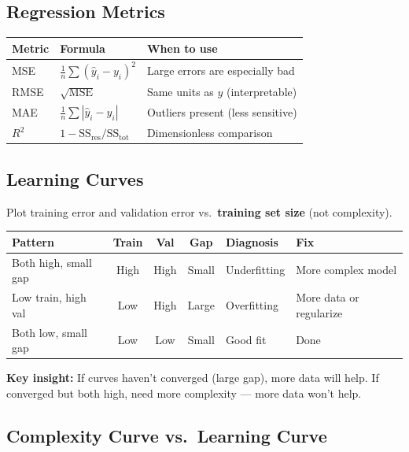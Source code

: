 \documentclass[11pt,a4paper]{article}
\begin{document}
\subsection{Regression Metrics}

\begin{center}
\begin{tabular}{|l|l|l|}
\hline
\textbf{Metric} & \textbf{Formula} & \textbf{When to use} \\
\hline
MSE & $\frac{1}{n}\sum(\hat{y}_i - y_i)^2$ & Large errors are especially bad \\
RMSE & $\sqrt{\text{MSE}}$ & Same units as $y$ (interpretable) \\
MAE & $\frac{1}{n}\sum|\hat{y}_i - y_i|$ & Outliers present (less sensitive) \\
$R^2$ & $1 - \text{SS}_{\text{res}}/\text{SS}_{\text{tot}}$ & Dimensionless comparison \\
\hline
\end{tabular}
\end{center}

\subsection{Learning Curves}

Plot training error and validation error vs.\ \textbf{training set size} (not complexity).

\begin{center}
\begin{tabular}{|l|c|c|c|l|l|}
\hline
\textbf{Pattern} & \textbf{Train} & \textbf{Val} & \textbf{Gap} & \textbf{Diagnosis} & \textbf{Fix} \\
\hline
Both high, small gap & High & High & Small & Underfitting & More complex model \\
Low train, high val & Low & High & Large & Overfitting & More data or regularize \\
Both low, small gap & Low & Low & Small & Good fit & Done \\
\hline
\end{tabular}
\end{center}

\textbf{Key insight:} If curves haven't converged (large gap), more data will help. If converged but both high, need more complexity --- more data won't help.

\subsection{Complexity Curve vs.\ Learning Curve}
\end{document}
